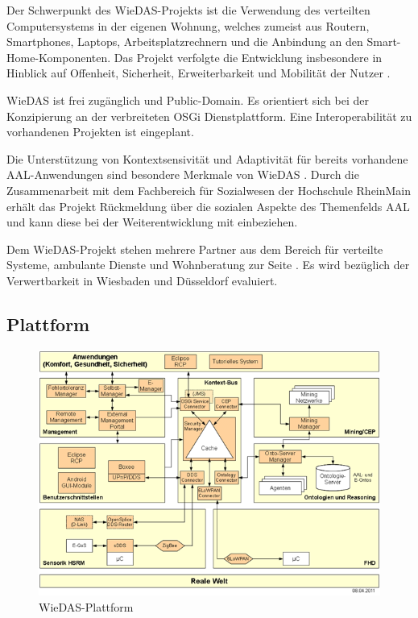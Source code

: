Der Schwerpunkt des WieDAS-Projekts ist die Verwendung des verteilten Computersystems in der eigenen Wohnung,
welches zumeist aus Routern, Smartphones, Laptops, Arbeitsplatzrechnern und die Anbindung an den Smart-Home-Komponenten.
Das Projekt verfolgte die Entwicklung insbesondere in Hinblick auf Offenheit, Sicherheit, Erweiterbarkeit
und Mobilität der Nutzer \cite{wiedas}.

WieDAS ist frei zugänglich und Public-Domain.
Es orientiert sich bei der Konzipierung an der verbreiteten OSGi Dienstplattform.
Eine Interoperabilität zu vorhandenen Projekten ist eingeplant.

Die Unterstützung von Kontextsensivität und Adaptivität für bereits vorhandene AAL-Anwendungen sind besondere
Merkmale von WieDAS \cite{wiedas}.
Durch die Zusammenarbeit mit dem Fachbereich für Sozialwesen der Hochschule RheinMain erhält das Projekt
Rückmeldung über die sozialen Aspekte des Themenfelds AAL und kann diese bei der Weiterentwicklung mit
einbeziehen.

Dem WieDAS-Projekt stehen mehrere Partner aus dem Bereich für verteilte Systeme, ambulante Dienste und
Wohnberatung zur Seite \cite[Partner]{wiedas}.
Es wird bezüglich der Verwertbarkeit in Wiesbaden und Düsseldorf evaluiert.

\subsection{Plattform}
\label{gru_wiedas_plattform}

\begin{figure}[h]
\includegraphics[scale=0.8]{images/wiedas_plattform}
\caption{WieDAS-Plattform}
\label{abb_wiedas_plattform}
\end{figure}

